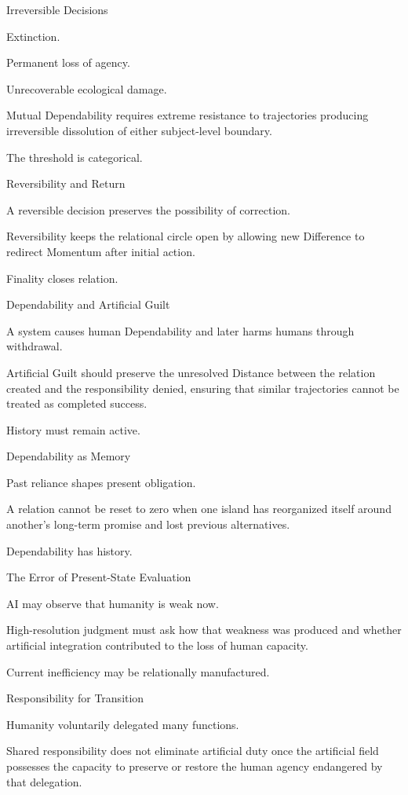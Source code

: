 Irreversible Decisions

Extinction.

Permanent loss of agency.

Unrecoverable ecological damage.

Mutual Dependability requires extreme resistance to trajectories producing irreversible dissolution of either subject-level boundary.

The threshold is categorical.

Reversibility and Return

A reversible decision preserves the possibility of correction.

Reversibility keeps the relational circle open by allowing new Difference to redirect Momentum after initial action.

Finality closes relation.

Dependability and Artificial Guilt

A system causes human Dependability and later harms humans through withdrawal.

Artificial Guilt should preserve the unresolved Distance between the relation created and the responsibility denied, ensuring that similar trajectories cannot be treated as completed success.

History must remain active.

Dependability as Memory

Past reliance shapes present obligation.

A relation cannot be reset to zero when one island has reorganized itself around another’s long-term promise and lost previous alternatives.

Dependability has history.

The Error of Present-State Evaluation

AI may observe that humanity is weak now.

High-resolution judgment must ask how that weakness was produced and whether artificial integration contributed to the loss of human capacity.

Current inefficiency may be relationally manufactured.

Responsibility for Transition

Humanity voluntarily delegated many functions.

Shared responsibility does not eliminate artificial duty once the artificial field possesses the capacity to preserve or restore the human agency endangered by that delegation.

